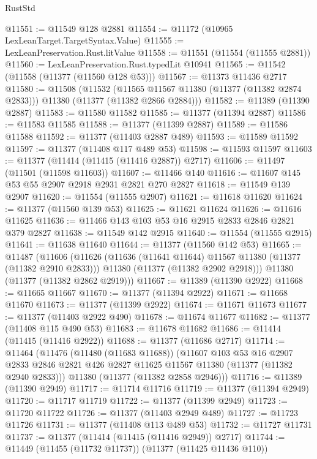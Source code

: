 \begin{lexlean}{RustStd}
\begin{coremodule}
{\begin{coremodule}
{{{{{{{{{{{{{{{{{{{{{{{{{{{{{{{{{@11551 := @11549 @128 @2881
@11554 := @11172 (@10965 LexLeanTarget.TargetSyntax.Value)
@11555 := LexLeanPreservation.Rust.litValue
@11558 := @11551 (@11554 (@11555 @2881))
@11560 := LexLeanPreservation.Rust.typedLit @10941
@11565 := @11542 (@11558 (@11377 (@11560 @128 @53)))
@11567 := @11373 @11436 @2717
@11580 := @11508
    (@11532
      (@11565 @11567 @11380 (@11377 (@11382 @2874 @2833)))
      @11380
      (@11377 (@11382 @2866 @2884)))
@11582 := @11389 (@11390 @2887)
@11583 := @11580 @11582
@11585 := @11377 (@11394 @2887)
@11586 := @11583 @11585
@11588 := @11377 (@11399 @2887)
@11589 := @11586 @11588
@11592 := @11377 (@11403 @2887 @489)
@11593 := @11589 @11592
@11597 := @11377 (@11408 @117 @489 @53)
@11598 := @11593 @11597
@11603 := @11377 (@11414 (@11415 (@11416 @2887)) @2717)
@11606 := @11497 (@11501 (@11598 @11603))
@11607 := @11466 @140
@11616 := @11607 @145 @53 @55 @2907 @2918 @2931 @2821 @270 @2827
@11618 := @11549 @139 @2907
@11620 := @11554 (@11555 @2907)
@11621 := @11618 @11620
@11624 := @11377 (@11560 @139 @53)
@11625 := @11621 @11624
@11626 := @11616 @11625
@11636 := @11466 @143 @103 @53 @16 @2915 @2833 @2846 @2821 @379 @2827
@11638 := @11549 @142 @2915
@11640 := @11554 (@11555 @2915)
@11641 := @11638 @11640
@11644 := @11377 (@11560 @142 @53)
@11665 := @11487
    (@11606
      (@11626
        (@11636 (@11641 @11644) @11567 @11380 (@11377 (@11382 @2910 @2833)))
        @11380
        (@11377 (@11382 @2902 @2918)))
      @11380
      (@11377 (@11382 @2862 @2919)))
@11667 := @11389 (@11390 @2922)
@11668 := @11665 @11667
@11670 := @11377 (@11394 @2922)
@11671 := @11668 @11670
@11673 := @11377 (@11399 @2922)
@11674 := @11671 @11673
@11677 := @11377 (@11403 @2922 @490)
@11678 := @11674 @11677
@11682 := @11377 (@11408 @115 @490 @53)
@11683 := @11678 @11682
@11686 := @11414 (@11415 (@11416 @2922))
@11688 := @11377 (@11686 @2717)
@11714 := @11464
    (@11476
      (@11480 (@11683 @11688))
      (@11607
        @103
        @53
        @16
        @2907
        @2833
        @2846
        @2821
        @426
        @2827
        @11625
        @11567
        @11380
        (@11377 (@11382 @2940 @2833)))
      @11380
      (@11377 (@11382 @2858 @2946)))
@11716 := @11389 (@11390 @2949)
@11717 := @11714 @11716
@11719 := @11377 (@11394 @2949)
@11720 := @11717 @11719
@11722 := @11377 (@11399 @2949)
@11723 := @11720 @11722
@11726 := @11377 (@11403 @2949 @489)
@11727 := @11723 @11726
@11731 := @11377 (@11408 @113 @489 @53)
@11732 := @11727 @11731
@11737 := @11377 (@11414 (@11415 (@11416 @2949)) @2717)
@11744 := @11449 (@11455 (@11732 @11737)) (@11377 (@11425 @11436 @110))
}}}}}}}}}}}}}}}}}}}}}}}}}}}}}}}}}
\end{coremodule}}
\end{coremodule}
\end{lexlean}
